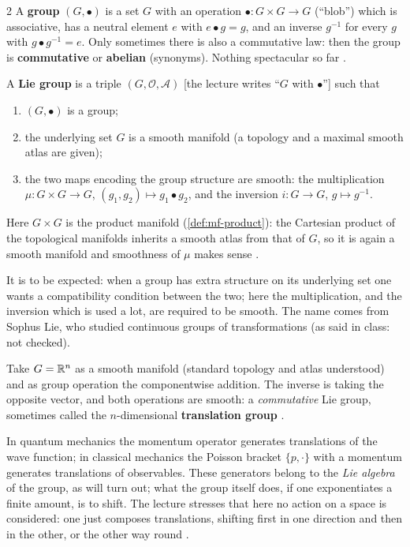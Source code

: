 \begin{paracol}{2}
A \textbf{group} $(G,\bullet)$ is a set $G$ with an operation $\bullet\colon G\times G\to G$ (``blob'') which is associative, has a neutral element $e$ with $e\bullet g=g$, and an inverse $g^{-1}$ for every $g$ with $g\bullet g^{-1}=e$. Only sometimes there is also a commutative law: then the group is \textbf{commutative} or \textbf{abelian} (synonyms). Nothing spectacular so far   .

\begin{definition}\label{def:ll-lie-group}
A \textbf{Lie group} is a triple $(G,\mathcal O,\mathcal A)$ [the lecture writes ``$G$ with $\bullet$''] such that
\begin{enumerate}
  \item[(i)] $(G,\bullet)$ is a group;
  \item[(ii)] the underlying set $G$ is a smooth manifold (a topology and a maximal smooth atlas are given);
  \item[(iii)] the two maps encoding the group structure are smooth: the multiplication $\mu\colon G\times G\to G$, $(g_1,g_2)\mapsto g_1\bullet g_2$, and the inversion $i\colon G\to G$, $g\mapsto g^{-1}$.
\end{enumerate}
Here $G\times G$ is the product manifold (\cref{def:mf-product}): the Cartesian product of the topological manifolds inherits a smooth atlas from that of $G$, so it is again a smooth manifold and smoothness of $\mu$ makes sense       .
\end{definition}
It is to be expected: when a group has extra structure on its underlying set one wants a compatibility condition between the two; here the multiplication, and the inversion which is used a lot, are required to be smooth. The name comes from Sophus Lie, who studied continuous groups of transformations (as said in class: not checked).

\begin{example}\label{ex:ll-translation}
Take $G=\mathbb{R}^n$ as a smooth manifold (standard topology and atlas understood) and as group operation the componentwise addition. The inverse is taking the opposite vector, and both operations are smooth: a \emph{commutative} Lie group, sometimes called the $n$-dimensional \textbf{translation group}   .
\end{example}
\begin{aside}
In quantum mechanics the momentum operator generates translations of the wave function; in classical mechanics the Poisson bracket $\{p,\cdot\}$ with a momentum generates translations of observables. These generators belong to the \emph{Lie algebra} of the group, as will turn out; what the group itself does, if one exponentiates a finite amount, is to shift. The lecture stresses that here no action on a space is considered: one just composes translations, shifting first in one direction and then in the other, or the other way round   .
\end{aside}


\end{paracol}
